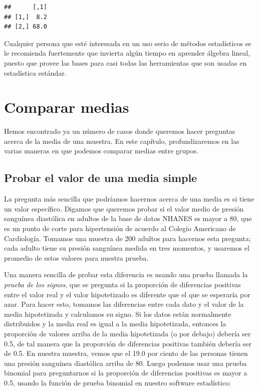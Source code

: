 \documentclass[
  12pt,
]{book}
\begin{document}
\begin{verbatim}
##      [,1]
## [1,]  8.2
## [2,] 68.0
\end{verbatim}

Cualquier persona que esté interesada en un uso serio de métodos estadísticos se le recomienda fuertemente que invierta algún tiempo en aprender álgebra lineal, puesto que provee las bases para casi todas las herramientas que son usadas en estadística estándar.

\hypertarget{comparar-medias}{%
\chapter{Comparar medias}\label{comparar-medias}}

Hemos encontrado ya un número de casos donde queremos hacer preguntas acerca de la media de una muestra. En este capítulo, profundizaremos en las varias maneras en que podemos comparar medias entre grupos.

\hypertarget{single-mean}{%
\section{Probar el valor de una media simple}\label{single-mean}}

La pregunta más sencilla que podríamos hacernos acerca de una media es si tiene un valor específico. Digamos que queremos probar si el valor medio de presión sanguínea diastólica en adultos de la base de datos NHANES es mayor a 80, que es un punto de corte para hipertensión de acuerdo al Colegio Americano de Cardiología. Tomamos una muestra de 200 adultos para hacernos esta pregunta; cada adulto tiene su presión sanguínea medida en tres momentos, y usaremos el promedio de estos valores para nuestra prueba.

Una manera sencilla de probar esta diferencia es usando una prueba llamada la \emph{prueba de los signos}, que se pregunta si la proporción de diferencias positivas entre el valor real y el valor hipotetizado es diferente que el que se esperaría por azar. Para hacer esto, tomamos las diferencias entre cada dato y el valor de la media hipotetizada y calculamos su signo. Si los datos están normalmente distribuidos y la media real es igual a la media hipotetizada, entonces la proporción de valores arriba de la media hipotetizada (o por debajo) debería ser 0.5, de tal manera que la proporción de diferencias positivas también debería ser de 0.5. En nuestra muestra, vemos que el 19.0 por ciento de las personas tienen una presión sanguínea diastólica arriba de 80. Luego podemos usar una prueba binomial para preguntarnos si la proporción de diferencias positivas es mayor a 0.5, usando la función de prueba binomial en nuestro software estadístico:
\end{document}
